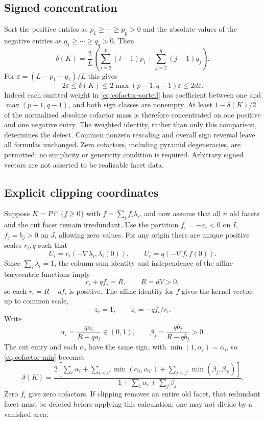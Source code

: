 \subsection{Signed concentration}
Sort the positive entries as $p_1\ge\cdots\ge p_p>0$ and the absolute
values of the negative entries as $q_1\ge\cdots\ge q_q>0$. Then
\begin{equation}\label{eq:cofactor-sorted}
 \delta(K)=\frac2L\left(\sum_{i=2}^p(i-1)p_i+
                              \sum_{j=2}^q(j-1)q_j\right).
\end{equation}
For $\varepsilon=(L-p_1-q_1)/L$ this gives
\begin{equation}\label{eq:cofactor-concentration}
 2\varepsilon\le\delta(K)\le2\max(p-1,q-1)\varepsilon
                          \le2d\varepsilon.
\end{equation}
Indeed each omitted weight in \eqref{eq:cofactor-sorted} has coefficient
between one and $\max(p-1,q-1)$, and both sign classes are nonempty.
At least $1-\delta(K)/2$ of the normalized absolute cofactor mass is
therefore concentrated on one positive and one negative entry. The
weighted identity, rather than only this comparison, determines the defect.
Common nonzero rescaling and overall sign reversal leave all formulas
unchanged. Zero cofactors, including pyramid degeneracies, are permitted;
no simplicity or genericity condition is required. Arbitrary signed
vectors are not asserted to be realizable facet data.

\subsection{Explicit clipping coordinates}
Suppose $K=P\cap\{f\ge0\}$ with $f=\sum_if_i\lambda_i$, and now assume
that all $n$ old facets and the cut facet remain irredundant. Use the
partition $f_i=-a_i<0$ on $I$, $f_j=b_j>0$ on $J$, allowing zero values.
For any origin there are unique positive scales $r_i,q$ such that
\[
 U_i=r_i(-\nabla\lambda_i,\lambda_i(0)),\qquad
 U_c=q(-\nabla f,f(0)).
\]
Since $\sum_i\lambda_i=1$, the column-sum identity and independence of the
affine barycentric functions imply
\begin{equation}\label{eq:cofactor-scales}
 r_i+qf_i=R,\qquad R=dV>0,
\end{equation}
so each $r_i=R-qf_i$ is positive. The affine identity for $f$ gives the
kernel vector, up to common scale,
\[
 z_c=1,\qquad z_i=-qf_i/r_i.
\]
Write
\[
 \alpha_i=\frac{qa_i}{R+qa_i}\in(0,1),\qquad
 \beta_j=\frac{qb_j}{R-qb_j}>0.
\]
The cut entry and each $\alpha_i$ have the same sign, with
$\min(1,\alpha_i)=\alpha_i$, so \eqref{eq:cofactor-min} becomes
\begin{equation}\label{eq:cofactor-clipping}
 \delta(K)=
 \frac{2\left[\sum_i\alpha_i+\sum_{i<i'}\min(\alpha_i,\alpha_{i'})+
                         \sum_{j<j'}\min(\beta_j,\beta_{j'})\right]}
 {1+\sum_i\alpha_i+\sum_j\beta_j}.
\end{equation}
Zero $f_i$ give zero cofactors. If clipping removes an entire old facet,
that redundant facet must be deleted before applying this calculation;
one may not divide by a vanished area.

